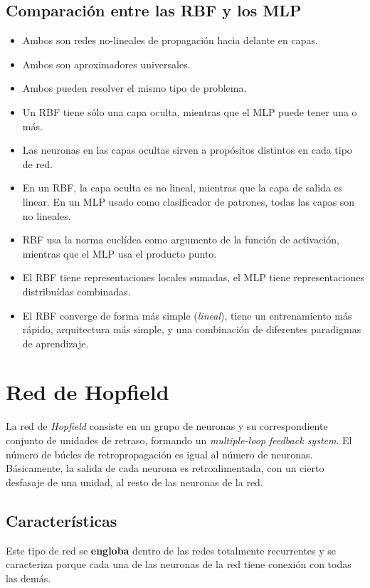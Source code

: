 \documentclass[10pt,a4paper]{article}
\begin{document}
\subsection{Comparación entre las RBF y los MLP}

\begin{itemize}
\item Ambos son redes no-lineales de propagación hacia delante en capas.
\item Ambos son aproximadores universales.
\item Ambos pueden resolver el mismo tipo de problema.
\item Un RBF tiene sólo una capa oculta, mientras que el MLP puede tener una o más.
\item Las neuronas en las capas ocultas sirven a propósitos distintos en cada tipo de red.
\item En un RBF, la capa oculta es no lineal, mientras que la capa de salida es linear. En un MLP usado como clasificador de patrones, todas las capas son no lineales.
\item RBF usa la norma euclídea como argumento de la función de activación, mientras que el MLP usa el producto punto.
\item El RBF tiene representaciones locales sumadas, el MLP tiene representaciones distribuídas combinadas.
\item El RBF converge de forma más simple (\textit{lineal}), tiene un entrenamiento más rápido, arquitectura más simple, y una combinación de diferentes paradigmas de aprendizaje.
\end{itemize}

\section{Red de Hopfield}

La red de \textit{Hopfield} consiste en un grupo de neuronas y su correspondiente conjunto de unidades de retraso, formando un \textit{multiple-loop feedback system}. El número de búcles de retropropagación es igual al número de neuronas. Básicamente, la salida de cada neurona es retroalimentada, con un cierto desfasaje de una unidad, al resto de las neuronas de la red.

\subsection{Características}

Este tipo de red se \textbf{engloba} dentro de las redes totalmente recurrentes y se caracteriza porque cada una de las neuronas de la red tiene conexión con todas las demás.
\end{document}
